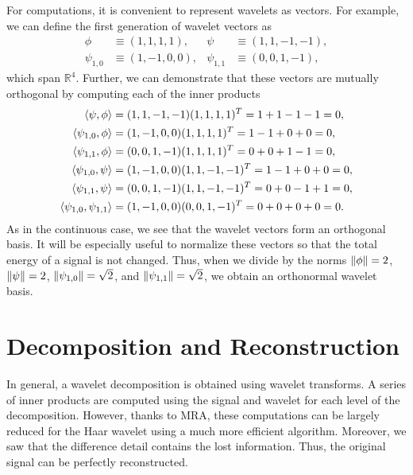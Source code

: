 \documentclass{article}
\DeclarePairedDelimiter{\iprod}{\langle}{\rangle}
\theoremstyle{definition}
\begin{document}
  For computations, it is convenient to represent wavelets as vectors. For example, we can define the first generation of wavelet vectors as
  \begin{align*}
    \phi &\equiv (1,1,1,1), &
    \psi &\equiv (1,1,-1,-1), \\
    \psi_{1,0} &\equiv (1,-1,0,0), &
    \psi_{1,1} &\equiv (0,0,1,-1),
  \end{align*}
  which span \(\mathbb{R}^4\). Further, we can demonstrate that these vectors are mutually orthogonal by computing each of the inner products
  \begin{align*}
    \iprod{\psi, \phi} &=
    (1,1,-1,-1) (1,1,1,1)^T = 1+1-1-1 = 0, \\
    \iprod{\psi_{1,0}, \phi} &=
    (1,-1,0,0) (1,1,1,1)^T = 1-1+0+0 = 0, \\
    \iprod{\psi_{1,1}, \phi} &=
    (0,0,1,-1) (1,1,1,1)^T = 0+0+1-1 = 0, \\
    \iprod{\psi_{1,0}, \psi} &=
    (1,-1,0,0) (1,1,-1,-1)^T = 1-1+0+0 = 0, \\
    \iprod{\psi_{1,1}, \psi} &=
    (0,0,1,-1) (1,1,-1,-1)^T = 0+0-1+1 = 0, \\
    \iprod{\psi_{1,0}, \psi_{1,1}} &=
    (1,-1,0,0) (0,0,1,-1)^T = 0+0+0+0 = 0.
  \end{align*}
  As in the continuous case, we see that the wavelet vectors form an orthogonal basis. It will be especially useful to normalize these vectors so that the total energy of a signal is not changed. Thus, when we divide by the norms \(\norm{\phi} = 2\), \(\norm{\psi} = 2\), \(\norm{\psi_{1,0}} = \sqrt{2}\), and \(\norm{\psi_{1,1}} = \sqrt{2}\), we obtain an orthonormal wavelet basis.
  
  \section{Decomposition and Reconstruction}

  In general, a wavelet decomposition is obtained using wavelet transforms. A series of inner products are computed using the signal and wavelet for each level of the decomposition. However, thanks to MRA, these computations can be largely reduced for the Haar wavelet using a much more efficient algorithm. Moreover, we saw that the difference detail contains the lost information. Thus, the original signal can be perfectly reconstructed.
\end{document}
